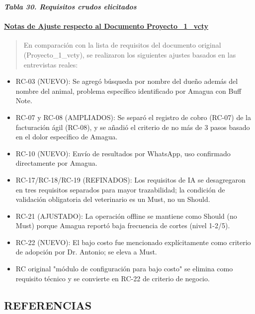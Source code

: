 \documentclass[
]{article}
\begin{document}
\protect{}\label{_bookmark117}{}\emph{\textbf{Tabla 30.
Requisitos crudos elicitados}}

\paragraph{\texorpdfstring{ \ul{Notas de Ajuste respecto al Documento
Proyecto\_1\_vcty}
}{ Notas de Ajuste respecto al Documento Proyecto\_1\_vcty }}\label{notas-de-ajuste-respecto-al-documento-proyecto_1_vcty}

\begin{quote}
En comparación con la lista de requisitos del documento original
(Proyecto\_1\_vcty), se realizaron los siguientes ajustes basados en las
entrevistas reales:
\end{quote}

\begin{itemize}
\item
  RC-03 (NUEVO): Se agregó búsqueda por nombre del dueño además del
  nombre del animal, problema específico identificado por Amagua con
  Buff Note.
\item
  RC-07 y RC-08 (AMPLIADOS): Se separó el registro de cobro (RC-07) de
  la facturación ágil (RC-08), y se añadió el criterio de no más de 3
  pasos basado en el dolor específico de Amagua.
\item
  RC-10 (NUEVO): Envío de resultados por WhatsApp, uso confirmado
  directamente por Amagua.
\item
  RC-17/RC-18/RC-19 (REFINADOS): Los requisitos de IA se desagregaron en
  tres requisitos separados para mayor trazabilidad; la condición de
  validación obligatoria del veterinario es un Must, no un Should.
\item
  RC-21 (AJUSTADO): La operación offline se mantiene como Should (no
  Must) porque Amagua reportó baja frecuencia de cortes (nivel 1-2/5).
\item
  RC-22 (NUEVO): El bajo costo fue mencionado explícitamente como
  criterio de adopción por Dr. Antonio; se eleva a Must.
\item
  RC original "módulo de configuración para bajo costo" se elimina como
  requisito técnico y se convierte en RC-22 de criterio de negocio.
\end{itemize}

\subsection{REFERENCIAS}\label{referencias-1}
\end{document}
